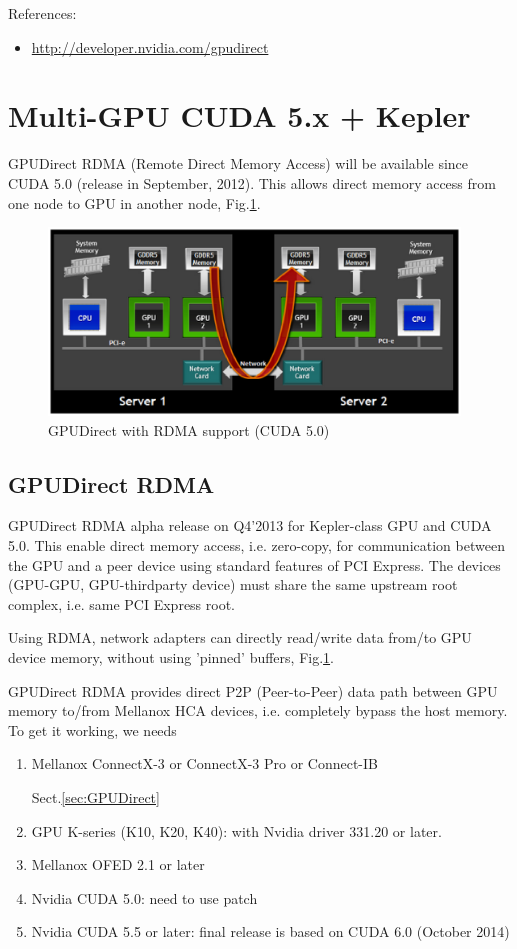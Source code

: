 References:
\begin{itemize}
  \item \url{http://developer.nvidia.com/gpudirect}
\end{itemize}


\section{Multi-GPU CUDA 5.x + Kepler}

GPUDirect RDMA (Remote Direct Memory Access) will be available since CUDA
5.0 (release in September, 2012). This allows direct memory access from one node
to GPU in another node, Fig.\ref{fig:GPUDirect_RDMA}.

\begin{figure}[hbt]
  \centerline{\includegraphics[height=5cm,
    angle=0]{./images/GPUDirect_RDMA.eps}}
  \caption{GPUDirect with RDMA support (CUDA 5.0)}
  \label{fig:GPUDirect_RDMA}
\end{figure}


\subsection{GPUDirect RDMA}
\label{sec:GPUDirect-v3}

GPUDirect RDMA alpha release on Q4'2013 for Kepler-class GPU and CUDA 5.0.
This enable direct memory access, i.e. zero-copy,  for communication between the
GPU and a peer device using standard features of PCI Express. 
The devices (GPU-GPU, GPU-thirdparty device) must share the same upstream root
complex, i.e. same PCI Express root. 

 Using
RDMA, network adapters can directly read/write data from/to GPU device memory, without using 'pinned'
buffers, Fig.\ref{fig:GPUDirect_RDMA}.

GPUDirect RDMA provides direct P2P (Peer-to-Peer) data path between GPU memory
to/from Mellanox HCA devices, i.e. completely bypass the host memory. To get it
working, we needs
\begin{enumerate}
  \item Mellanox ConnectX-3 or ConnectX-3 Pro or Connect-IB
  
Sect.\ref{sec:GPUDirect}  
  
  \item GPU K-series (K10, K20, K40): with Nvidia driver 331.20 or later.
  \item Mellanox OFED 2.1 or later
  \item Nvidia CUDA 5.0: need to use patch
  \item Nvidia CUDA 5.5 or later: final release is based on CUDA 6.0 (October
  2014) 
\end{enumerate}
 
